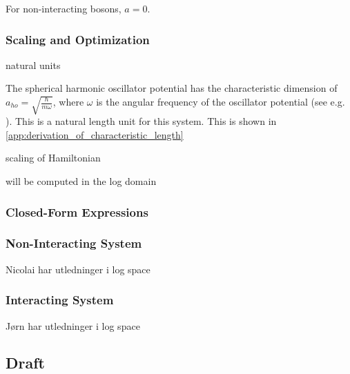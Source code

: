 For non-interacting bosons, $a=0$. 

\subsubsection{Scaling and Optimization}

natural units 

The spherical harmonic oscillator potential has the characteristic dimension of $a_{ho}=\sqrt{\frac{\hbar}{m\omega}}$, where $\omega$ is the angular frequency of the oscillator potential (see e.g. \cite{Dalfovo1999}). This is a natural length unit for this system. This is shown in \autoref{app:derivation_of_characteristic_length}

scaling of Hamiltonian

will be computed in the log domain

\subsubsection{Closed-Form Expressions}

\subsubsection*{Non-Interacting System}

Nicolai har utledninger i log space

\subsubsection*{Interacting System}

Jørn har utledninger i log space

\subsection{Draft}


